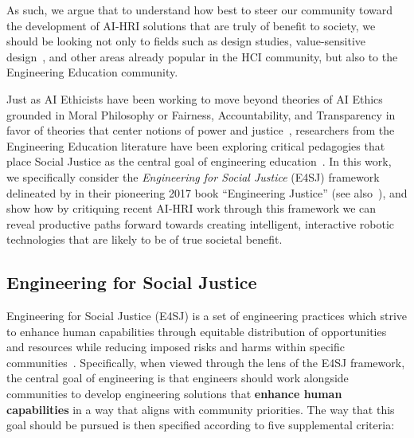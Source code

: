 \documentclass[letterpaper]{article} %
\begin{document}
As such, we argue that to understand how best to steer our community toward the development of AI-HRI solutions that are truly of benefit to society, we should be looking not only to fields such as design studies, value-sensitive design~\cite{friedman1996value}, and other areas already popular in the HCI community, but also to the Engineering Education community.

Just as AI Ethicists have been working to move beyond theories of AI Ethics grounded in Moral Philosophy or Fairness, Accountability, and Transparency in favor of theories that center notions of power and justice~\cite{bennett2020point,le2020we}, researchers from the Engineering Education literature have been exploring critical pedagogies that place Social Justice as the central goal of engineering education~\cite{leydens2014design,leydens2017engineering,nieusma2013engineering,riley2008engineering,winberg2017using}.
%
In this work, we specifically consider the \textit{Engineering for Social Justice} (E4SJ) framework delineated by \citet{leydens2017engineering} in their pioneering 2017 book ``Engineering Justice'' (see also~\citet{leydens2017confronting,leydens2016making}), and show how by critiquing recent AI-HRI work through this framework we can reveal productive paths forward towards creating intelligent, interactive robotic technologies that are likely to be of true societal benefit.


\subsection{Engineering for Social Justice}
Engineering for Social Justice (E4SJ) is a set of engineering practices which strive to enhance
human capabilities through equitable distribution of opportunities and resources while reducing imposed risks and harms within specific communities~\cite{leydens2017engineering}.
%
Specifically, when viewed through the lens of the E4SJ framework, the central goal of engineering is that engineers should work alongside communities to develop engineering solutions that \textbf{enhance human capabilities} in a way that aligns with community priorities. The way that this goal should be pursued is then specified according to five supplemental criteria:
\end{document}
